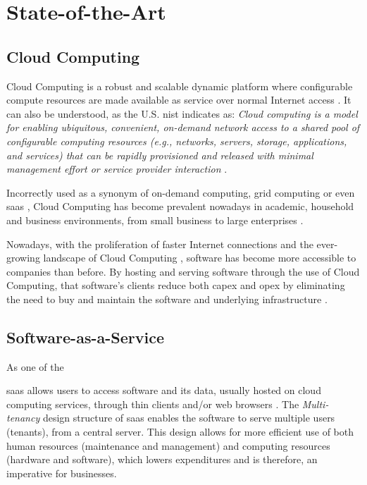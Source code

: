 \chapter{State-of-the-Art}\label{state-of-the-art}

\section{Cloud Computing}\label{state-of-the-art:s:cloud-computing}

Cloud Computing is a robust and scalable dynamic platform where configurable compute resources are made available as service over normal Internet access \Parencite{alnumay_2020}.
It can also be understood, as the U.S. \gls{nist} indicates as:
\textit{Cloud computing is a model for enabling ubiquitous, convenient, on-demand network access to a shared pool of configurable computing resources (e.g., networks, servers, storage, applications, and services) that can be rapidly provisioned and released with minimal management effort or service provider interaction} \Parencite{mell_grance_2011}. 

Incorrectly used as a synonym of on-demand computing, grid computing or even \gls{saas} \Parencite{kim_2009}, Cloud Computing has become prevalent nowadays in academic, household and business environments, from small business to large enterprises \parencite{rezaei_chiew_lee_shams_aliee_2014}.

Nowadays, with the proliferation of faster Internet connections and the ever-growing landscape of Cloud Computing
\Parencite{dillon_tharam_and_wu_chen_and_chang_elizabeth}, software has become more accessible to companies than before.
By hosting and serving software through the use of Cloud Computing, that software's clients reduce both \gls{capex} and \gls{opex} by eliminating the need to buy and maintain the software and underlying infrastructure \Parencite{alnumay_2020}.

\section{Software-as-a-Service}\label{state-of-the-art:s:software-as-a-service}

As one of the 

\gls{saas} allows users to access software and its data, usually hosted on cloud computing services, through thin clients and/or web browsers \Parencite{mell_grance_2011}\parencite{Ali_Abdulrazzaq_and_Md_Sultan_Abu_Bakar_and_abdul_ghani_Abdul_azim_and_Zulzalil_Hazura}. The \textit{Multi-tenancy} design structure of \gls{saas} enables the software to serve multiple users (tenants), from a central server. This design allows for more efficient use of both human resources (maintenance and management) and computing resources (hardware and software), which lowers expenditures and is therefore, an imperative for businesses.

